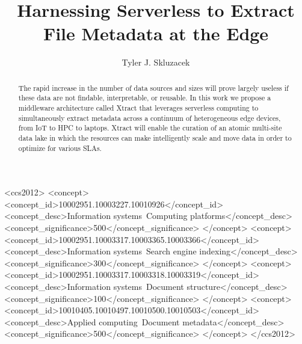 \documentclass[sigconf]{acmart}
\newcommand{\tyler}[1]{}
\newcommand{\tyler}[1]{{\textcolor{cyan}{ tyler: #1 }}}
\begin{document}
\title{Harnessing Serverless to Extract File Metadata at the Edge}


\author{Tyler J. Skluzacek} 



\renewcommand{\shortauthors}{Skluzacek et al.}

\begin{abstract}
\tyler{max 100 words}

\tyler{GRAND-er. be more dramatic. }
The rapid increase in the number of data sources and sizes will prove largely 
useless if these data are not findable, interpretable, or reusable. In this work 
we propose a middleware architecture called Xtract that leverages serverless 
computing to simultaneously extract metadata across a continuum of heterogeneous edge 
devices, from IoT to HPC to 
laptops. Xtract will enable the curation of an atomic multi-site data lake in which the
resources can make intelligently scale and move data in order to optimize for various 
SLAs.


\end{abstract}

\begin{CCSXML}
<ccs2012>
<concept>
<concept_id>10002951.10003227.10010926</concept_id>
<concept_desc>Information systems~Computing platforms</concept_desc>
<concept_significance>500</concept_significance>
</concept>
<concept>
<concept_id>10002951.10003317.10003365.10003366</concept_id>
<concept_desc>Information systems~Search engine indexing</concept_desc>
<concept_significance>300</concept_significance>
</concept>
<concept>
<concept_id>10002951.10003317.10003318.10003319</concept_id>
<concept_desc>Information systems~Document structure</concept_desc>
<concept_significance>100</concept_significance>
</concept>
<concept>
<concept_id>10010405.10010497.10010500.10010503</concept_id>
<concept_desc>Applied computing~Document metadata</concept_desc>
<concept_significance>500</concept_significance>
</concept>
</ccs2012>
\end{CCSXML}



\maketitle
\end{document}
